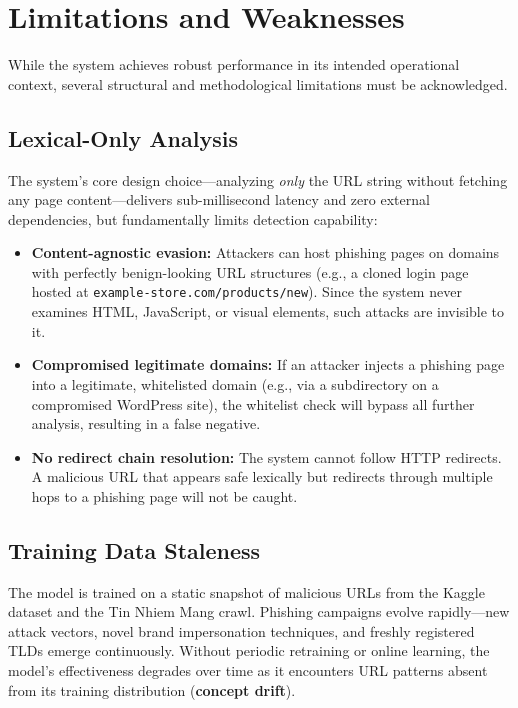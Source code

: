 \documentclass[12pt,a4paper]{article}
\begin{document}
\section{Limitations and Weaknesses}
\label{sec:weaknesses}

While the system achieves robust performance in its intended operational context, several structural and methodological limitations must be acknowledged.

\subsection{Lexical-Only Analysis}

The system's core design choice---analyzing \textit{only} the URL string without fetching any page content---delivers sub-millisecond latency and zero external dependencies, but fundamentally limits detection capability:
\begin{itemize}
    \item \textbf{Content-agnostic evasion:} Attackers can host phishing pages on domains with perfectly benign-looking URL structures (e.g., a cloned login page hosted at \texttt{example-store.com/products/new}). Since the system never examines HTML, JavaScript, or visual elements, such attacks are invisible to it.
    \item \textbf{Compromised legitimate domains:} If an attacker injects a phishing page into a legitimate, whitelisted domain (e.g., via a subdirectory on a compromised WordPress site), the whitelist check will bypass all further analysis, resulting in a false negative.
    \item \textbf{No redirect chain resolution:} The system cannot follow HTTP redirects. A malicious URL that appears safe lexically but redirects through multiple hops to a phishing page will not be caught.
\end{itemize}

\subsection{Training Data Staleness}

The model is trained on a static snapshot of malicious URLs from the Kaggle dataset and the Tin Nhiem Mang crawl. Phishing campaigns evolve rapidly---new attack vectors, novel brand impersonation techniques, and freshly registered TLDs emerge continuously. Without periodic retraining or online learning, the model's effectiveness degrades over time as it encounters URL patterns absent from its training distribution (\textbf{concept drift}).
\end{document}
